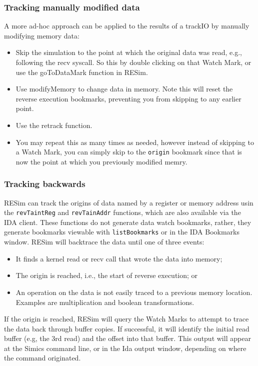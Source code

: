 \documentclass[titlepage]{article}
\begin{document}
\subsubsection{Tracking manually modified data}
A more ad-hoc approach can be applied to the results of a trackIO by manually modifying memory data:
\begin{itemize}
\item Skip the simulation to the point at which the original data was read, e.g., following the recv syscall.  So this by double clicking
on that Watch Mark, or use the goToDataMark function in RESim.
\item Use modifyMemory to change data in memory.  Note this will reset the reverse execution bookmarks, preventing you from skipping to
any earlier point.
\item Use the retrack function.
\item You may repeat this as many times as needed, however instead of skipping to a Watch Mark, you can simply skip to the {\tt origin}
bookmark since that is now the point at which you previously modified memry.
\end{itemize}

\subsubsection{Tracking backwards}
RESim can track the origins of data named by a register or memory address usin the {\tt revTaintReg} and {\tt revTainAddr} functions, which are also
available via the IDA client.  These functions do not generate data watch bookmarks, rather, they generate bookmarks viewable with {\tt listBookmarks} or
in the IDA Bookmarks window.  RESim will backtrace the data until one of three events:
\begin{itemize}
\item It finds a kernel read or recv call that wrote the data into memory;
\item The origin is reached, i.e., the start of reverse execution; or
\item An operation on the data is not easily traced to a previous memory location.  Examples are multiplication and boolean transformations.
\end{itemize}
If the origin is reached, RESim will query the Watch Marks to attempt to trace the data back through buffer copies.  If successful, it will identify
the initial read buffer (e.g, the 3rd read) and the offset into that buffer.  This output will appear at the Simics command line, or in the Ida output
window, depending on where the command originated.
\end{document}
